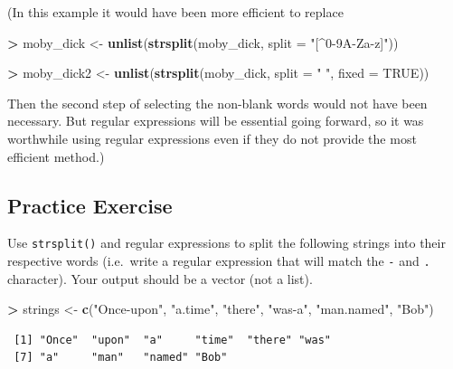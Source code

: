 \documentclass[]{krantz}
\makeatletter
\newenvironment{Shaded}{\begin{snugshade}}{\end{snugshade}}
\newcommand{\KeywordTok}[1]{\textcolor[rgb]{0.27,0.27,0.27}{\textbf{#1}}}
\newcommand{\DataTypeTok}[1]{\textcolor[rgb]{0.27,0.27,0.27}{#1}}
\newcommand{\StringTok}[1]{\textcolor[rgb]{0.5,0.5,0.5}{#1}}
\newcommand{\OtherTok}[1]{\textcolor[rgb]{0.37,0.37,0.37}{#1}}
\newcommand{\OperatorTok}[1]{\textcolor[rgb]{0.43,0.43,0.43}{\textbf{#1}}}
\newcommand{\NormalTok}[1]{#1}
\newenvironment{kframe}{%
\medskip{}
\setlength{\fboxsep}{.8em}
 \def\at@end@of@kframe{}%
 \ifinner\ifhmode%
  \def\at@end@of@kframe{\end{minipage}}%
  \begin{minipage}{\columnwidth}%
 \fi\fi%
 \def\FrameCommand##1{\hskip\@totalleftmargin \hskip-\fboxsep
 \colorbox{shadecolor}{##1}\hskip-\fboxsep
     \hskip-\linewidth \hskip-\@totalleftmargin \hskip\columnwidth}%
 \MakeFramed {\advance\hsize-\width
   \@totalleftmargin\z@ \linewidth\hsize
   \@setminipage}}%
 {\par\unskip\endMakeFramed%
 \at@end@of@kframe}
\renewenvironment{Shaded}{\begin{kframe}}{\end{kframe}}
\makeatother
\begin{document}
(In this example it would have been more efficient to replace

\begin{Shaded}
\begin{Highlighting}[]
\OperatorTok{>}\StringTok{ }\NormalTok{moby_dick <-}\StringTok{ }\KeywordTok{unlist}\NormalTok{(}\KeywordTok{strsplit}\NormalTok{(moby_dick, }\DataTypeTok{split =} \StringTok{"[^0-9A-Za-z]"}\NormalTok{))}
\end{Highlighting}
\end{Shaded}

\begin{Shaded}
\begin{Highlighting}[]
\OperatorTok{>}\StringTok{ }\NormalTok{moby_dick2 <-}\StringTok{ }\KeywordTok{unlist}\NormalTok{(}\KeywordTok{strsplit}\NormalTok{(moby_dick, }\DataTypeTok{split =} \StringTok{" "}\NormalTok{, }\DataTypeTok{fixed =} \OtherTok{TRUE}\NormalTok{))}
\end{Highlighting}
\end{Shaded}

Then the second step of selecting the non-blank words would not have
been necessary. But regular expressions will be essential going forward,
so it was worthwhile using regular expressions even if they do not
provide the most efficient method.)

\subsection{Practice Exercise}\label{practice-exercise-14}

Use \texttt{strsplit()} and regular expressions to split the following
strings into their respective words (i.e.~write a regular expression
that will match the \texttt{-} and \texttt{.} character). Your output
should be a vector (not a list).

\begin{Shaded}
\begin{Highlighting}[]
\OperatorTok{>}\StringTok{ }\NormalTok{strings <-}\StringTok{ }\KeywordTok{c}\NormalTok{(}\StringTok{"Once-upon"}\NormalTok{, }\StringTok{"a.time"}\NormalTok{, }\StringTok{"there"}\NormalTok{, }\StringTok{"was-a"}\NormalTok{, }\StringTok{"man.named"}\NormalTok{, }\StringTok{"Bob"}\NormalTok{)}
\end{Highlighting}
\end{Shaded}

\begin{verbatim}
 [1] "Once"  "upon"  "a"     "time"  "there" "was"  
 [7] "a"     "man"   "named" "Bob"  
\end{verbatim}
\end{document}
